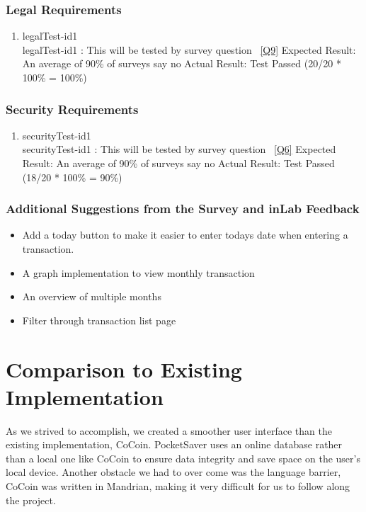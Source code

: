 \documentclass[12pt, titlepage]{article}
\begin{document}
\subsubsection{Legal Requirements}
\begin{enumerate}
\item{legalTest-id1\\}
legalTest-id1 : This will be tested by survey question ~\ref{Q9}
\newline
	Expected Result: An average of 90\% of surveys say no
\newline
	Actual Result: Test Passed (20/20 * 100\% = 100\%)
\end{enumerate}

\subsubsection{Security Requirements}
\begin{enumerate}
\item{securityTest-id1\\}
securityTest-id1 : This will be tested by survey question ~\ref{Q6}
\newline
Expected Result: An average of 90\% of surveys say no
\newline
	Actual Result: Test Passed (18/20 * 100\% = 90\%)
\end{enumerate}

\subsubsection{Additional Suggestions from the Survey and inLab Feedback}
\begin{itemize}
\item {Add a today button to make it easier to enter todays date when entering a transaction.}
\item{A graph implementation to view monthly transaction}
\item{An overview of multiple months}
\item{Filter through transaction list page}
\end{itemize}

\section{Comparison to Existing Implementation}	
As we strived to accomplish, we created a smoother user interface than the existing implementation, CoCoin. PocketSaver uses an online database rather than a local one like CoCoin to ensure data integrity and save space on the user's local device. Another obstacle we had to over come was the language barrier, CoCoin was written in Mandrian, making it very difficult for us to follow along the project.
\end{document}
